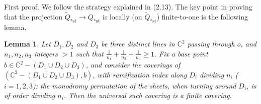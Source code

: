 \documentclass[12pt,a4paper]{article}
\theoremstyle{plain}
\newtheorem{lemma}[theorem]{Lemma}
\theoremstyle{definition}
\theoremstyle{remark}
\begin{document}
First proof. We follow the strategy explained in (2.13). The key point in proving that the projection $\widetilde{Q}_{*\text{st}} \to Q_{*\text{st}}$ is locally (on $\widetilde{Q}_{*\text{st}}$) finite-to-one is the following lemma.

\begin{lemma}
\label{10.3}
Let $D_1, D_2$ and $D_3$ be three distinct lines in $\mathbb{C}^2$ passing through $o$, and $n_1, n_2, n_3$ integers $> 1$ such that $\frac{1}{n_1} + \frac{1}{n_2} + \frac{1}{n_3} \geqslant 1$. Fix a base point $b \in \mathbb{C}^2 - (D_1 \cup D_2 \cup D_3)$, and consider the coverings of $(\mathbb{C}^2 - (D_1 \cup D_2 \cup D_3), b)$, with ramification index along $D_i$ dividing $n_i$ ($i = 1, 2, 3$): the monodromy permutation of the sheets, when turning around $D_i$, is of order dividing $n_i$. Then the universal such covering is a finite covering.
\end{lemma}
\end{document}
